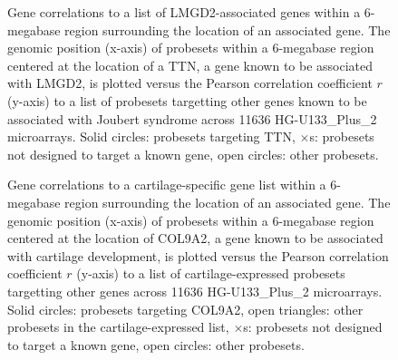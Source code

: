 \documentclass{bioinfo}
\begin{document}

\begin{figure}[!tpb]
\label{figure:TTN}
\centerline{}
\caption{Gene correlations to a list of LMGD2-associated genes within a
6-megabase region surrounding the location of an associated gene.  The genomic
position (x-axis) of probesets within a 6-megabase region centered at the
location of a TTN, a gene known to be associated with LMGD2, is plotted versus
the Pearson correlation coefficient $r$ (y-axis) to a list of probesets
targetting other genes known to be associated with Joubert syndrome across
11636 HG-U133\_Plus\_2 microarrays.  Solid circles: probesets targeting TTN,
$\times$s: probesets not designed to target a known gene, open circles: other
probesets.}
\end{figure}


\begin{figure}[!tpb]
\label{figure:COL9A2}
\centerline{}
\caption{Gene correlations to a cartilage-specific gene list within a 6-megabase region
surrounding the location of an associated gene.  The genomic position (x-axis)
of probesets within a 6-megabase region centered at the location of COL9A2, a
gene known to be associated with cartilage development, is plotted versus the
Pearson correlation coefficient $r$ (y-axis) to a list of cartilage-expressed
probesets targetting other genes across 11636 HG-U133\_Plus\_2 microarrays.
Solid circles: probesets targeting COL9A2, open triangles: other probesets in
the cartilage-expressed list, $\times$s: probesets not designed to target a
known gene, open circles: other probesets.}
\end{figure}

\end{document}
